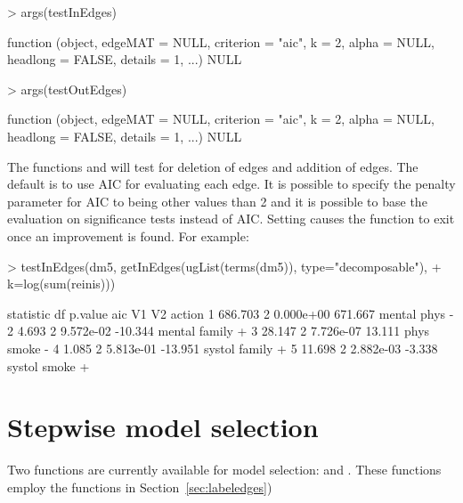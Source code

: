 \documentclass[12pt]{article}
\begin{document}
\begin{Schunk}
\begin{Sinput}
> args(testInEdges)
\end{Sinput}
\begin{Soutput}
function (object, edgeMAT = NULL, criterion = "aic", k = 2, alpha = NULL, 
    headlong = FALSE, details = 1, ...) 
NULL
\end{Soutput}
\begin{Sinput}
> args(testOutEdges)
\end{Sinput}
\begin{Soutput}
function (object, edgeMAT = NULL, criterion = "aic", k = 2, alpha = NULL, 
    headlong = FALSE, details = 1, ...) 
NULL
\end{Soutput}
\end{Schunk}



The functions  and  will
test for deletion of edges and addition of edges. The default is to
use AIC for evaluating each edge. It is possible to specify the penalty parameter for AIC to being other
values than 2 and it is possible to base the evaluation on
significance tests instead of AIC. Setting  causes
the function to exit once an improvement is found.
For example:

\begin{Schunk}
\begin{Sinput}
> testInEdges(dm5, getInEdges(ugList(terms(dm5)), type="decomposable"),
+              k=log(sum(reinis)))
\end{Sinput}
\begin{Soutput}
  statistic df   p.value     aic     V1     V2 action
1   686.703  2 0.000e+00 671.667 mental   phys      -
2     4.693  2 9.572e-02 -10.344 mental family      +
3    28.147  2 7.726e-07  13.111   phys  smoke      -
4     1.085  2 5.813e-01 -13.951 systol family      +
5    11.698  2 2.882e-03  -3.338 systol  smoke      +
\end{Soutput}
\end{Schunk}






\section{Stepwise model selection}
\label{sec:stepwise}

Two functions are currently available for model selection:
 and . These functions employ the
functions in Section~\ref{sec:labeledges})
\end{document}
